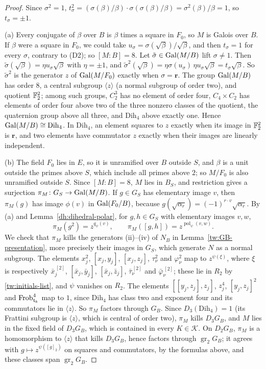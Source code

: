 \begin{proof}
Since $\sigma^2=1$, $t_\sigma^2=(\sigma(\beta)/\beta)\cdot\sigma(\sigma(\beta)/\beta)
=\sigma^2(\beta)/\beta=1$, so $t_\sigma=\pm1$.

(a) Every conjugate of $\beta$ over $B$ is $\beta$ times a square in $F_0$, so
$M$ is Galois over $B$. If $\beta$ were a square in $F_0$, we could take
$u_\sigma=\sigma(\sqrt\beta)/\sqrt\beta$, and then $t_\sigma=1$ for every
$\sigma$, contrary to (D2); so $[M:B]=8$. Let $\tilde\sigma\in\operatorname{Gal}(M/B)$ lift
$\sigma\ne1$. Then $\tilde\sigma(\sqrt\beta)=\eta u_\sigma\sqrt\beta$ with
$\eta=\pm1$, and
$\tilde\sigma^2(\sqrt\beta)=\eta\sigma(u_\sigma)\,\eta u_\sigma\sqrt\beta
=t_\sigma\sqrt\beta$. So $\tilde\sigma^2$ is the generator $z$ of
$\operatorname{Gal}(M/F_0)$ exactly when $\sigma=\mathbf r$. The group $\operatorname{Gal}(M/B)$ has order
$8$, a central subgroup $\langle z\rangle$ (a normal subgroup of order two),
and quotient $\mathbb F_2^2$; among such groups, $C_2^3$ has no element of order
four, $C_4\times C_2$ has elements of order four above two of the three
nonzero classes of the quotient, the quaternion group above all three, and
$\mathrm{Dih}_4$ above exactly one. Hence $\operatorname{Gal}(M/B)\cong\mathrm{Dih}_4$. In
$\mathrm{Dih}_4$, an element squares to $z$ exactly when its image in
$\mathbb F_2^2$ is $\mathbf r$, and two elements have commutator $z$ exactly when
their images are linearly independent.

(b) The field $F_0$ lies in $E$, so it is unramified over $B$ outside $S$,
and $\beta$ is a unit outside the primes above $S$, which include all primes
above $2$; so $M/F_0$ is also unramified outside $S$. Since $[M:B]=8$, $M$
lies in $B_S$, and restriction gives a surjection $\pi_M\colon
G_S\to\operatorname{Gal}(M/B)$. If $g\in G_S$ has elementary image $v$, then $\pi_M(g)$ has
image $\phi(v)$ in $\operatorname{Gal}(F_0/B)$, because $g(\sqrt{\alpha_r})=(-1)^{r\cdot v}
\sqrt{\alpha_r}$. By (a) and Lemma~\ref{dh:dihedral-polar}, for $g,h\in G_S$
with elementary images $v,w$,
\[
 \pi_M(g^2)=z^{q_\psi(v)},\qquad \pi_M([g,h])=z^{\operatorname{pol}_\psi(v,w)}.
\]
We check that $\pi_M$ kills the generators (ii)--(iv) of $N_B$ in
Lemma~\ref{tw:GB-presentation}, more precisely their images in $G_S$, which
generate $N$ as a normal subgroup. The elements $x_j^2$, $[x_j,y_j]$,
$[x_j,z_j]$, $\tau_\nu^2$ and $\varphi_\nu^2$ map to $z^{\psi(\xi)}$, where
$\xi$ is respectively $\bar x_j^{\,[2]}$, $[\bar x_j,\bar y_j]$,
$[\bar x_j,\bar z_j]$, $\bar\tau_\nu^{\,[2]}$ and $\bar\varphi_\nu^{\,[2]}$;
these lie in $R_2$ by \eqref{tw:initials-list}, and $\psi$ vanishes on $R_2$.
The elements $[[y_j,z_j],z_j]$, $z_j^4$, $[y_j,z_j]^2$ and
$\operatorname{Frob}_{\mathfrak t_k}^4$ map to $1$, since $\mathrm{Dih}_4$ has class two
and exponent four and its commutators lie in $\langle z\rangle$. So $\pi_M$
factors through $G_B$. Since $D_3(\mathrm{Dih}_4)=1$ (its Frattini subgroup
is $\langle z\rangle$, which is central of order two), $\pi_M$ kills
$D_3G_B$, and $M$ lies in the fixed field of $D_3G_B$, which is contained in
every $K\in\mathcal K$. On $D_2G_B$, $\pi_M$ is a homomorphism to
$\langle z\rangle$ that kills $D_3G_B$, hence factors through
$\operatorname{gr}_2G_B$; it agrees with $g\mapsto z^{\psi([g]_2)}$ on
squares and commutators, by the formulas above, and these classes span
$\operatorname{gr}_2G_B$.


\end{proof}

